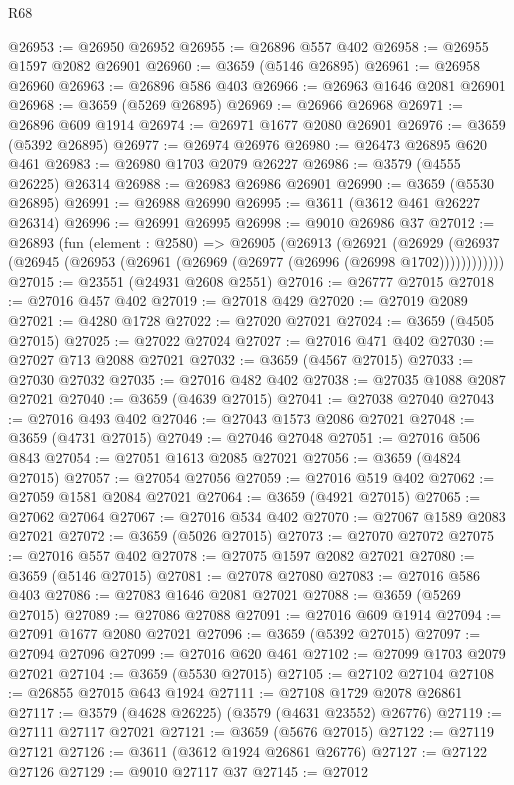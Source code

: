 \begin{lexlean}{R68}
\begin{coremodule}
@26953 := @26950 @26952
@26955 := @26896 @557 @402
@26958 := @26955 @1597 @2082 @26901
@26960 := @3659 (@5146 @26895)
@26961 := @26958 @26960
@26963 := @26896 @586 @403
@26966 := @26963 @1646 @2081 @26901
@26968 := @3659 (@5269 @26895)
@26969 := @26966 @26968
@26971 := @26896 @609 @1914
@26974 := @26971 @1677 @2080 @26901
@26976 := @3659 (@5392 @26895)
@26977 := @26974 @26976
@26980 := @26473 @26895 @620 @461
@26983 := @26980 @1703 @2079 @26227
@26986 := @3579 (@4555 @26225) @26314
@26988 := @26983 @26986 @26901
@26990 := @3659 (@5530 @26895)
@26991 := @26988 @26990
@26995 := @3611 (@3612 @461 @26227 @26314)
@26996 := @26991 @26995
@26998 := @9010 @26986 @37
@27012 := @26893
    (fun (element : @2580) =>
    @26905
      (@26913
        (@26921
          (@26929 (@26937 (@26945 (@26953 (@26961 (@26969 (@26977 (@26996 (@26998 @1702))))))))))))
@27015 := @23551 (@24931 @2608 @2551)
@27016 := @26777 @27015
@27018 := @27016 @457 @402
@27019 := @27018 @429
@27020 := @27019 @2089
@27021 := @4280 @1728
@27022 := @27020 @27021
@27024 := @3659 (@4505 @27015)
@27025 := @27022 @27024
@27027 := @27016 @471 @402
@27030 := @27027 @713 @2088 @27021
@27032 := @3659 (@4567 @27015)
@27033 := @27030 @27032
@27035 := @27016 @482 @402
@27038 := @27035 @1088 @2087 @27021
@27040 := @3659 (@4639 @27015)
@27041 := @27038 @27040
@27043 := @27016 @493 @402
@27046 := @27043 @1573 @2086 @27021
@27048 := @3659 (@4731 @27015)
@27049 := @27046 @27048
@27051 := @27016 @506 @843
@27054 := @27051 @1613 @2085 @27021
@27056 := @3659 (@4824 @27015)
@27057 := @27054 @27056
@27059 := @27016 @519 @402
@27062 := @27059 @1581 @2084 @27021
@27064 := @3659 (@4921 @27015)
@27065 := @27062 @27064
@27067 := @27016 @534 @402
@27070 := @27067 @1589 @2083 @27021
@27072 := @3659 (@5026 @27015)
@27073 := @27070 @27072
@27075 := @27016 @557 @402
@27078 := @27075 @1597 @2082 @27021
@27080 := @3659 (@5146 @27015)
@27081 := @27078 @27080
@27083 := @27016 @586 @403
@27086 := @27083 @1646 @2081 @27021
@27088 := @3659 (@5269 @27015)
@27089 := @27086 @27088
@27091 := @27016 @609 @1914
@27094 := @27091 @1677 @2080 @27021
@27096 := @3659 (@5392 @27015)
@27097 := @27094 @27096
@27099 := @27016 @620 @461
@27102 := @27099 @1703 @2079 @27021
@27104 := @3659 (@5530 @27015)
@27105 := @27102 @27104
@27108 := @26855 @27015 @643 @1924
@27111 := @27108 @1729 @2078 @26861
@27117 := @3579 (@4628 @26225) (@3579 (@4631 @23552) @26776)
@27119 := @27111 @27117 @27021
@27121 := @3659 (@5676 @27015)
@27122 := @27119 @27121
@27126 := @3611 (@3612 @1924 @26861 @26776)
@27127 := @27122 @27126
@27129 := @9010 @27117 @37
@27145 := @27012

\end{coremodule}
\end{lexlean}
